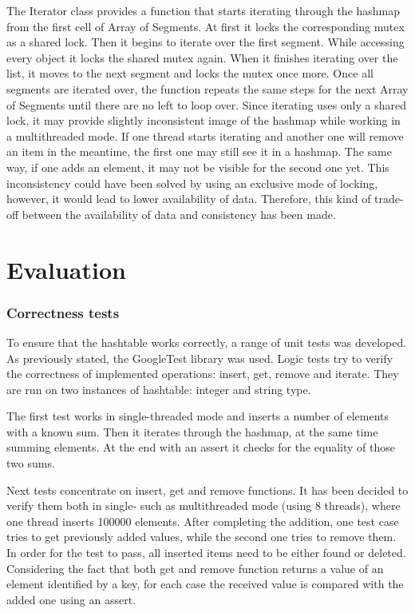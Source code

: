         The Iterator class provides a function that starts iterating through the hashmap from the first cell of Array of Segments. At first it locks the corresponding mutex as a shared lock. Then it begins to iterate over the first segment. While accessing every object it locks the shared mutex again. When it finishes iterating over the list, it moves to the next segment and locks the mutex once more. Once all segments are iterated over, the function repeats the same steps for the next Array of Segments until there are no left to loop over. Since iterating uses only a shared lock, it may provide slightly inconsistent image of the hashmap while working in a multithreaded mode. If one thread starts iterating and another one will remove an item in the meantime, the first one may still see it in a hashmap. The same way, if one adds an element, it may not be visible for the second one yet. This inconsistency could have been solved by using an exclusive mode of locking, however, it would lead to lower availability of data. Therefore, this kind of trade-off between the availability of data and consistency has been made.

\section{Evaluation}

    \subsubsection{Correctness tests}
        To ensure that the hashtable works correctly, a range of unit tests was developed. As previously stated, the GoogleTest library was used. Logic tests try to verify the correctness of implemented operations: insert, get, remove and iterate. They are run on two instances of hashtable: integer and string type. 
    
        The first test works in single-threaded mode and inserts a number of elements with a known sum. Then it iterates through the hashmap, at the same time summing elements. At the end with an assert it checks for the equality of those two sums. 
        
        Next tests concentrate on insert, get and remove functions. It has been decided to verify them both in single- such as multithreaded mode (using 8 threads), where one thread inserts 100000 elements. After completing the addition, one test case tries to get previously added values, while the second one tries to remove them. In order for the test to pass, all inserted items need to be either found or deleted. Considering the fact that both get and remove function returns a value of an element identified by a key, for each case the received value is compared with the added one using an assert.
        
